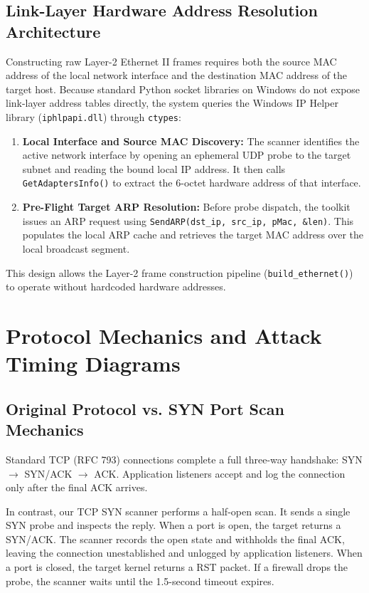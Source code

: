 \documentclass[11pt,a4paper]{article}
\begin{document}
\subsection{Link-Layer Hardware Address Resolution Architecture}
Constructing raw Layer-2 Ethernet II frames requires both the source MAC address of the local network interface and the destination MAC address of the target host. Because standard Python socket libraries on Windows do not expose link-layer address tables directly, the system queries the Windows IP Helper library (\texttt{iphlpapi.dll}) through \texttt{ctypes}:

\begin{enumerate}[nosep, leftmargin=1.5em]
    \item \textbf{Local Interface and Source MAC Discovery:} The scanner identifies the active network interface by opening an ephemeral UDP probe to the target subnet and reading the bound local IP address. It then calls \texttt{GetAdaptersInfo()} to extract the 6-octet hardware address of that interface.
    \item \textbf{Pre-Flight Target ARP Resolution:} Before probe dispatch, the toolkit issues an ARP request using \texttt{SendARP(dst\_ip, src\_ip, pMac, \&len)}. This populates the local ARP cache and retrieves the target MAC address over the local broadcast segment.
\end{enumerate}
This design allows the Layer-2 frame construction pipeline (\texttt{build\_ethernet()}) to operate without hardcoded hardware addresses.

\clearpage

\section{Protocol Mechanics and Attack Timing Diagrams}

\subsection{Original Protocol vs. SYN Port Scan Mechanics}
Standard TCP (RFC 793) connections complete a full three-way handshake: SYN $\to$ SYN/ACK $\to$ ACK. Application listeners accept and log the connection only after the final ACK arrives.

In contrast, our TCP SYN scanner performs a half-open scan. It sends a single SYN probe and inspects the reply. When a port is open, the target returns a SYN/ACK. The scanner records the open state and withholds the final ACK, leaving the connection unestablished and unlogged by application listeners. When a port is closed, the target kernel returns a RST packet. If a firewall drops the probe, the scanner waits until the 1.5-second timeout expires.
\end{document}
